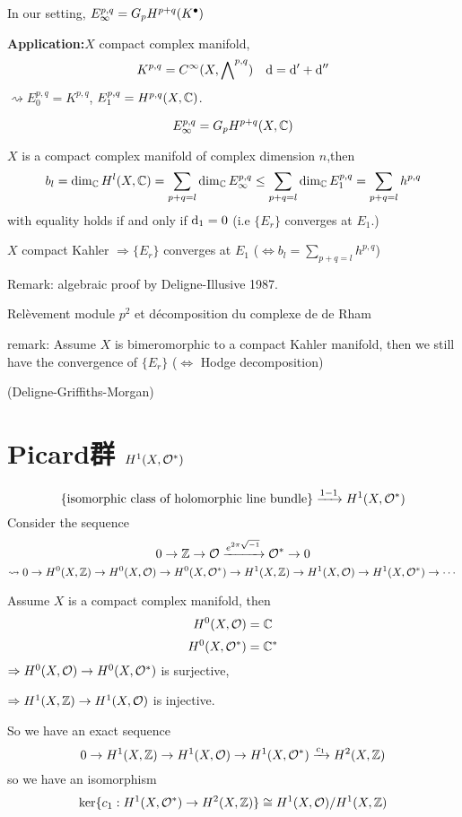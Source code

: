 In our setting, $E_\infty^{p,q}=G_pH^{p+q}(K^{\bullet})$

\textbf{Application:}$X$ compact complex manifold,
$$K^{p,q}=C^\infty(X,\bigwedge\nolimits^{p,q})\quad \mathrm{d}=\mathrm{d}'+\mathrm{d}''$$
$\rightsquigarrow E_0^{p,q}=K^{p,q}$,
$E_1^{p,q}=H^{p,q}(X,\mathbb{C})$.

\begin{cor}
$$E^{p,q}_\infty=G_pH^{p+q}(X,\mathbb{C})$$
\end{cor}

\begin{thm}
$X$ is a compact complex manifold of complex dimension $n$,then
$$b_l=\dim_{\mathbb{C}}H^l(X,\mathbb{C})=\sum_{p+q=l}\dim_{\mathbb{C}}E_\infty^{p,q}\leq
\sum_{p+q=l}\dim_{\mathbb{C}}E_1^{p,q}=\sum_{p+q=l}h^{p,q}$$
with equality holds if and only if $\mathrm{d}_1=0$
(i.e $\{E_r\}$ converges at $E_1$.)
\end{thm}

\begin{thm} $X$ compact Kahler $\Rightarrow\{E_r\}$ converges at $E_1$
($\iff b_l=\sum\limits_{p+q=l}h^{p,q}$)
\end{thm}

Remark: algebraic proof by Deligne-Illusive 1987.

Rel\`{e}vement module $p^2$ et d\'{e}composition du complexe de de Rham

remark: Assume $X$ is bimeromorphic to a compact Kahler manifold,
then we still have the convergence of $\{E_r\}$
($\iff$ Hodge decomposition)

(Deligne-Griffiths-Morgan)

\section{Picard群 $H^1(X,\mathcal{O}^*)$}
$$\{\text{isomorphic class of holomorphic line bundle}\}
\xrightarrow{1-1} H^1(X,\mathcal{O}^*)$$
Consider the sequence
$$0\to\mathbb{Z}\to\mathcal{O}\xrightarrow{e^{2\pi\sqrt{-1}}}\mathcal{O}^*\to 0$$
$$
  \rightsquigarrow
  0\to H^0(X,\mathbb{Z})\to H^0(X,\mathcal{O})\to H^0(X,\mathcal{O}^*)
  \to H^1(X,\mathbb{Z})\to H^1(X,\mathcal{O})\to H^1(X,\mathcal{O}^*)\to\cdots
$$

Assume $X$ is a compact complex manifold, then
$$H^0(X,\mathcal{O})=\mathbb{C}$$
$$H^0(X,\mathcal{O}^*)=\mathbb{C}^*$$
$\Rightarrow H^0(X,\mathcal{O})\to H^0(X,\mathcal{O}^*)$ is surjective,

$\Rightarrow H^1(X,\mathbb{Z})\to H^1(X,\mathcal{O})$ is injective.

So we have an exact sequence
$$
  0\to H^1(X,\mathbb{Z})\to H^1(X,\mathcal{O})
  \to H^1(X,\mathcal{O}^*)\xrightarrow{c_1}H^2(X,\mathbb{Z})
$$
so we have an isomorphism
$$\ker\{c_1:H^1(X,\mathcal{O}^*)\to H^2(X,\mathbb{Z})\}\cong H^1(X,\mathcal{O})/H^1(X,\mathbb{Z})$$


